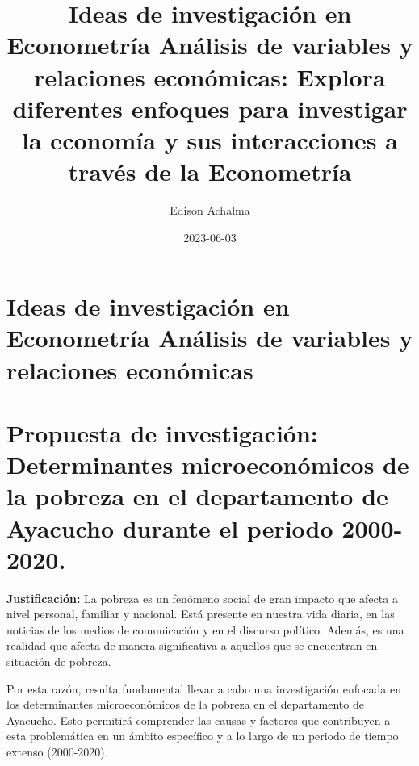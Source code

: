 \documentclass[
  man,
  floatsintext,
  longtable,
  a4paper,
  nolmodern,
  notxfonts,
  notimes,
  colorlinks=true,linkcolor=blue,citecolor=blue,urlcolor=blue]{apa7}
\title{Ideas de investigación en Econometría Análisis de variables y
relaciones económicas: Explora diferentes enfoques para investigar la
economía y sus interacciones a través de la Econometría}
\author{Edison Achalma}
\affiliation{
{Escuela Profesional de Economía, Universidad Nacional de San Cristóbal
de Huamanga}}
\date{2023-06-03}
\begin{document}
\maketitle

\hypertarget{toc}{}
\tableofcontents
\newpage
\section[Introduction]{Ideas de investigación en Econometría Análisis de
variables y relaciones económicas}

\setcounter{secnumdepth}{-\maxdimen} %

\setlength\LTleft{0pt}


\section{Propuesta de investigación: Determinantes microeconómicos de la
pobreza en el departamento de Ayacucho durante el periodo
2000-2020.}\label{propuesta-de-investigaciuxf3n-determinantes-microeconuxf3micos-de-la-pobreza-en-el-departamento-de-ayacucho-durante-el-periodo-2000-2020.}

\textbf{Justificación:} La pobreza es un fenómeno social de gran impacto
que afecta a nivel personal, familiar y nacional. Está presente en
nuestra vida diaria, en las noticias de los medios de comunicación y en
el discurso político. Además, es una realidad que afecta de manera
significativa a aquellos que se encuentran en situación de pobreza.

Por esta razón, resulta fundamental llevar a cabo una investigación
enfocada en los determinantes microeconómicos de la pobreza en el
departamento de Ayacucho. Esto permitirá comprender las causas y
factores que contribuyen a esta problemática en un ámbito específico y a
lo largo de un periodo de tiempo extenso (2000-2020).
\end{document}
